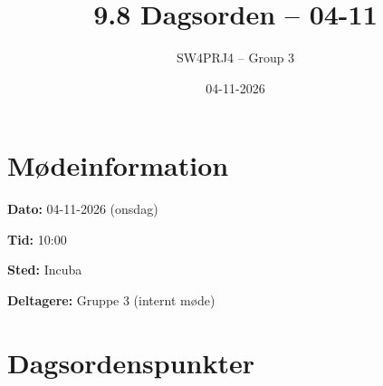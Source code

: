 \documentclass[a4paper,11pt]{article}
\title{9.8 Dagsorden -- 04-11}
\author{SW4PRJ4 -- Group 3}
\date{04-11-2026}
\begin{document}
\maketitle

\section*{Mødeinformation}

\textbf{Dato:} 04-11-2026 (onsdag)

\textbf{Tid:} 10:00

\textbf{Sted:} Incuba

\textbf{Deltagere:} Gruppe 3 (internt møde)

\section*{Dagsordenspunkter}
\end{document}
